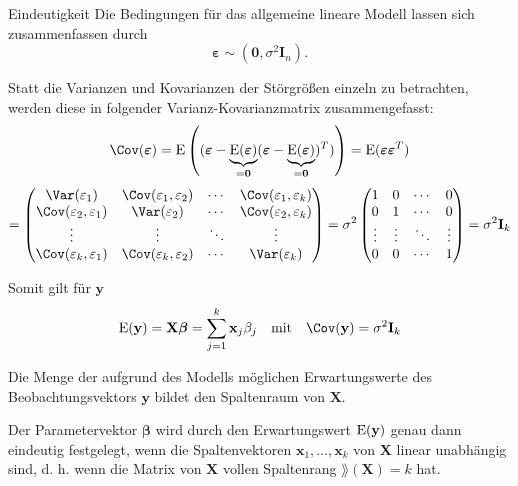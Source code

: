 \begin{bonus}{Eindeutigkeit}
    Die Bedingungen für das allgemeine lineare Modell lassen sich zusammenfassen durch
    \[
        {\boldsymbol{\varepsilon}} \sim (\mathbf{0}, \sigma^2 \mathbf{I}_n).
    \]

    Statt die Varianzen und Kovarianzen der Störgrößen einzeln zu betrachten, werden diese in folgender Varianz-Kovarianzmatrix zusammengefasst:
    \[
        \Cov({\boldsymbol{\varepsilon}})
        = \E \left( ({\boldsymbol{\varepsilon}} - \underbrace{\E({\boldsymbol{\varepsilon}})}_{= \mathbf{0}} ({\boldsymbol{\varepsilon}} - \underbrace{\E({\boldsymbol{\varepsilon}})}_{= \mathbf{0}})^T) \right)
        = \E({\boldsymbol{\varepsilon}}{\boldsymbol{\varepsilon}}^T)
    \]
    \[
        = \begin{pmatrix}
            \Var(\varepsilon_1)                & \Cov(\varepsilon_1, \varepsilon_2) & \cdots & \Cov(\varepsilon_1, \varepsilon_k) \\
            \Cov(\varepsilon_2, \varepsilon_1) & \Var(\varepsilon_2)                & \cdots & \Cov(\varepsilon_2, \varepsilon_k) \\
            \vdots                             & \vdots                             & \ddots & \vdots                             \\
            \Cov(\varepsilon_k, \varepsilon_1) & \Cov(\varepsilon_k, \varepsilon_2) & \cdots & \Var(\varepsilon_k)
        \end{pmatrix}
        = \sigma^2 \begin{pmatrix}
            1      & 0      & \cdots & 0      \\
            0      & 1      & \cdots & 0      \\
            \vdots & \vdots & \ddots & \vdots \\
            0      & 0      & \cdots & 1
        \end{pmatrix}
        = \sigma^2 \mathbf{I}_k
    \]

    Somit gilt für $\mathbf{y}$
    \[
        \E (\mathbf{y}) = \mathbf{X}{\boldsymbol{\beta}} = \sum_{j=1}^{k} \mathbf{x}_j\beta_j \quad \text{mit} \quad \Cov(\mathbf{y}) = \sigma^2 \mathbf{I}_k
    \]

    Die Menge der aufgrund des Modells möglichen Erwartungswerte des Beobachtungsvektors $\mathbf{y}$ bildet den Spaltenraum von $\mathbf{X}$.

    Der Parametervektor ${\boldsymbol{\beta}}$ wird durch den Erwartungswert $\operatorname{E} (\mathbf{y})$ genau dann eindeutig festgelegt, wenn die Spaltenvektoren $\mathbf{x}_1, \ldots, \mathbf{x}_k$ von $\mathbf{X}$ linear unabhängig sind, d. h. wenn die Matrix von $\mathbf{X}$ vollen Spaltenrang $\rang(\mathbf{X}) = k$ hat.
\end{bonus}

